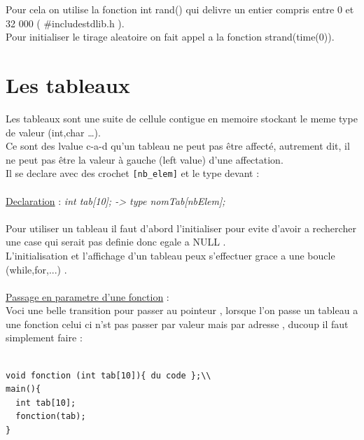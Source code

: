 \documentclass[a4paper,12pt,openany]{book}
\begin{document}
{Pour cela on utilise la fonction int rand() qui delivre un entier compris entre 0 et 32 000 ( #include{stdlib.h} ).\\
Pour initialiser le tirage aleatoire on fait appel a la fonction strand(time(0)).\\





\chapter{Les tableaux}

Les tableaux sont une suite de cellule contigue en memoire stockant le meme type de valeur (int,char \ldots).\\
Ce sont des lvalue c-a-d qu'un tableau ne peut pas \^etre affect\'e, autrement dit, il ne peut pas \^etre la valeur à gauche (left value) d’une affectation.\\
Il se declare avec des crochet \verb+[nb_elem]+ et le type devant :\\
\\
\underline{Declaration} : \emph{int tab[10]; -> type nomTab[nbElem];}\\
\\
Pour utiliser un tableau il faut d'abord l'initialiser pour evite d'avoir a rechercher une case qui serait pas definie donc egale a NULL .\\
L'initialisation et l'affichage d'un tableau peux s'effectuer grace a une boucle (while,for,...) .\\
\\
\underline{Passage en parametre d'une fonction} :\\

Voci une belle transition pour passer au pointeur , lorsque l'on passe un tableau a une fonction celui ci n'st pas passer par valeur mais par adresse , ducoup il faut simplement faire :\\
\\
\begin{verbatim}
void fonction (int tab[10]){ du code };\\
main(){ 
  int tab[10];
  fonction(tab);
}
\end{verbatim}




}
\end{document}

